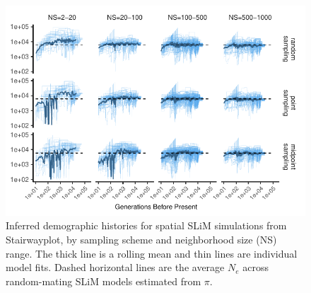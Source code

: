 \documentclass[9pt,twocolumn,twoside,lineno]{gsajnl}
\begin{document}
\afterpage{\clearpage}
\begin{figure}[p]
\centering
\includegraphics[width=\textwidth]{stairwayplot_facet_rollmean.pdf}
\caption{Inferred demographic histories for spatial SLiM simulations from Stairwayplot, by sampling scheme and neighborhood size (NS) range. The thick line is a rolling mean and thin lines are individual model fits. Dashed horizontal lines are the average $N_{e}$ across random-mating SLiM models estimated from $\pi$.}
\label{fig:spectrum}
\end{figure}
\end{document}
